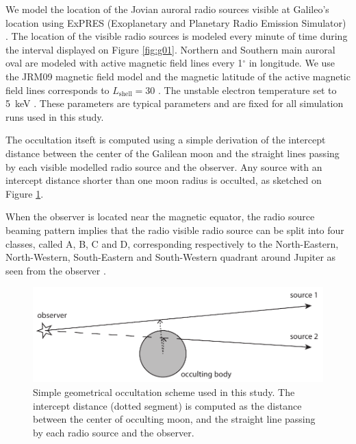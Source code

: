 \documentclass[referee]{aa}
\begin{document}
We model the location of the Jovian auroral radio sources visible at Galileo's location using ExPRES (Exoplanetary and Planetary Radio Emission Simulator) \citep{Louis_AA_2019}. The location of the visible radio sources is modeled every minute of time during the interval displayed on Figure \ref{fig:g01}. Northern and Southern main auroral oval are modeled with active magnetic field lines every 1$^\circ$ in longitude.  We use the JRM09 magnetic field model \citep{Connerney:2018jx} and the magnetic latitude of the active magnetic field lines corresponds to $L_\textrm{shell}=30$ \citep{Grodent:2015eo}. The unstable electron temperature set to 5~keV \citep{Louarn:2017bc}. These parameters are typical parameters and are fixed for all simulation runs used in this study.

The occultation itseft is computed using a simple derivation of the intercept distance between the center of the Galilean moon and the straight lines passing by each visible modelled radio source and the observer. Any source with an intercept distance shorter than one moon radius is occulted, as sketched on Figure \ref{fig:occult}.

When the observer is located near the magnetic equator, the radio source beaming pattern implies that the radio visible radio source can be split into four classes, called A, B, C and D, corresponding respectively to the North-Eastern, North-Western, South-Eastern and South-Western quadrant around Jupiter as seen from the observer \citep[see, e.g.,][for a definition]{Louis_AA_2019}. 


\begin{figure}
\centering\includegraphics[width=0.7\linewidth]{occult.pdf}
\caption{Simple geometrical occultation scheme used in this study. The intercept distance (dotted segment) is computed as the distance between the center of occulting moon, and the straight line passing by each radio source and the observer.}\label{fig:occult}
\end{figure}
\end{document}
